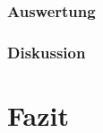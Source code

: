\documentclass[12pt,a4paper]{article}
\begin{document}
\subsubsection{Auswertung}
\subsubsection{Diskussion}



\section{Fazit}
\end{document}
